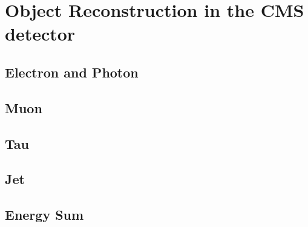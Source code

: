 \chapter{Object Reconstruction in the CMS detector}
\label{chap:Reco}

\section{Electron and Photon}
\label{sec:Electron}

\section{Muon}
\label{sec:Muon}

\section{Tau}
\label{sec:Tau}

\section{Jet}
\label{sec:Jet}

\section{Energy Sum}
\label{sec:MET}